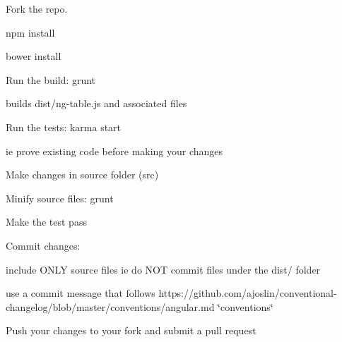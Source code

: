 
\begin{DoxyEnumerate}
\item Fork the repo.
\item {\ttfamily npm install}
\item {\ttfamily bower install}
\item Run the build\+: {\ttfamily grunt}
\begin{DoxyItemize}
\item builds dist/ng-\/table.\+js and associated files
\end{DoxyItemize}
\item Run the tests\+: {\ttfamily karma start}
\begin{DoxyItemize}
\item ie prove existing code before making your changes
\end{DoxyItemize}
\item Make changes in source folder ({\ttfamily src})
\end{DoxyEnumerate}
\begin{DoxyEnumerate}
\item Minify source files\+: {\ttfamily grunt}
\item Make the test pass
\item Commit changes\+:
\begin{DoxyItemize}
\item include O\+N\+LY source files ie do N\+OT commit files under the dist/ folder
\item use a commit message that follows https\+://github.com/ajoslin/conventional-\/changelog/blob/master/conventions/angular.\+md \char`\"{}conventions\char`\"{}
\end{DoxyItemize}
\item Push your changes to your fork and submit a pull request 
\end{DoxyEnumerate}